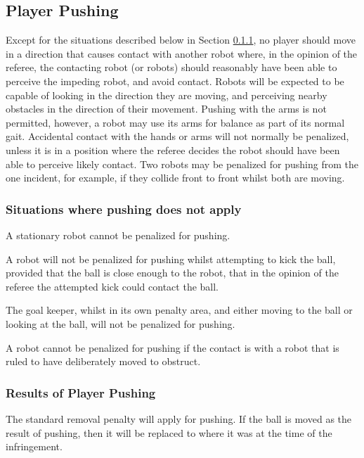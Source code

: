 \documentclass[12pt]{article}
\begin{document}
\subsection{Player Pushing}
\label{sec:player_pushing}

Except for the situations described below in Section \ref{sec:not_pushing}, no player should move in a direction that causes contact with another robot where, in the opinion of the referee, the contacting robot (or robots) should reasonably have been able to perceive the impeding robot, and avoid contact. Robots will be expected to be capable of looking in the direction they are moving, and perceiving nearby obstacles in the direction of their movement. Pushing with the arms is not permitted, however, a robot may use its arms for balance as part of its normal gait. Accidental contact with the hands or arms will not normally be penalized, unless it is in a position where the referee decides the robot should have been able to perceive likely contact.  Two robots may be penalized for pushing from the one incident, for example, if they collide front to front whilst both are moving.

\subsubsection{Situations where pushing does not apply}\label{sec:not_pushing}

A stationary robot cannot be penalized for pushing.

A robot will not be penalized for pushing whilst attempting to kick the ball, provided that the ball is close enough to the robot, that in the opinion of the referee the attempted kick could contact the ball.

The goal keeper, whilst in its own penalty area, and either moving to the ball or looking at the ball, will not be penalized for pushing.

A robot cannot be penalized for pushing if the contact is with a robot that is ruled to have deliberately moved to obstruct.

\subsubsection{Results of Player Pushing}

The standard removal penalty will apply for pushing. If the ball is moved as the result of pushing, then it will be replaced to where it was at the time of the infringement.
\end{document}
